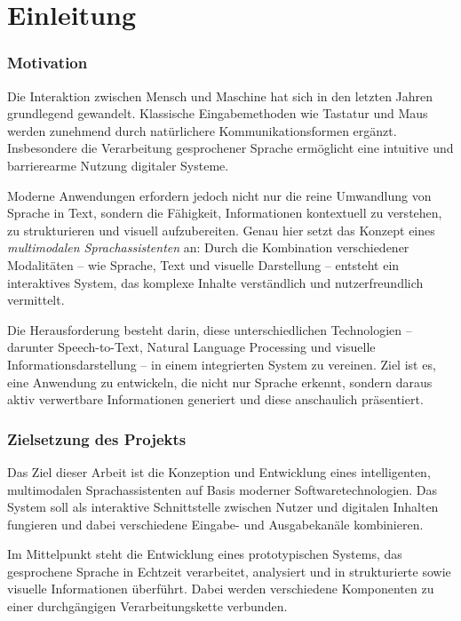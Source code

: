 \chapter{Einleitung}
\label{chap:einleitung}

\subsection{Motivation}
Die Interaktion zwischen Mensch und Maschine hat sich in den letzten Jahren grundlegend gewandelt. Klassische Eingabemethoden wie Tastatur und Maus werden zunehmend durch natürlichere Kommunikationsformen ergänzt. Insbesondere die Verarbeitung gesprochener Sprache ermöglicht eine intuitive und barrierearme Nutzung digitaler Systeme.

Moderne Anwendungen erfordern jedoch nicht nur die reine Umwandlung von Sprache in Text, sondern die Fähigkeit, Informationen kontextuell zu verstehen, zu strukturieren und visuell aufzubereiten. Genau hier setzt das Konzept eines \textit{multimodalen Sprachassistenten} an: Durch die Kombination verschiedener Modalitäten – wie Sprache, Text und visuelle Darstellung – entsteht ein interaktives System, das komplexe Inhalte verständlich und nutzerfreundlich vermittelt.

Die Herausforderung besteht darin, diese unterschiedlichen Technologien – darunter Speech-to-Text, Natural Language Processing und visuelle Informationsdarstellung – in einem integrierten System zu vereinen. Ziel ist es, eine Anwendung zu entwickeln, die nicht nur Sprache erkennt, sondern daraus aktiv verwertbare Informationen generiert und diese anschaulich präsentiert.

\subsection{Zielsetzung des Projekts}
Das Ziel dieser Arbeit ist die Konzeption und Entwicklung eines intelligenten, multimodalen Sprachassistenten auf Basis moderner Softwaretechnologien. Das System soll als interaktive Schnittstelle zwischen Nutzer und digitalen Inhalten fungieren und dabei verschiedene Eingabe- und Ausgabekanäle kombinieren.

Im Mittelpunkt steht die Entwicklung eines prototypischen Systems, das gesprochene Sprache in Echtzeit verarbeitet, analysiert und in strukturierte sowie visuelle Informationen überführt. Dabei werden verschiedene Komponenten zu einer durchgängigen Verarbeitungskette verbunden.

